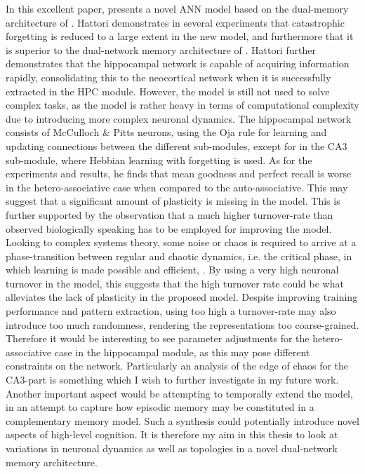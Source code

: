 In this excellent paper, \cite{Hattori2014} presents a novel ANN model based on the dual-memory architecture of \cite{McClelland1995}. Hattori demonstrates in several experiments that catastrophic forgetting is reduced to a large extent in the new model, and furthermore that it is superior to the dual-network memory architecture of \cite{Ans1997, French1997, Hattori2010}. Hattori further demonstrates that the hippocampal network is capable of acquiring information rapidly, consolidating this to the neocortical network when it is successfully extracted in the HPC module.
However, the model is still not used to solve complex tasks, as the model is rather heavy in terms of computational complexity due to introducing more complex neuronal dynamics. The hippocampal network consists of McCulloch \& Pitts neurons, using the Oja rule for learning and updating connections between the different sub-modules, except for in the CA3 sub-module, where Hebbian learning with forgetting is used.
As for the experiments and results, he finds that mean goodness and perfect recall is worse in the hetero-associative case when compared to the auto-associative. This may suggest that a significant amount of plasticity is missing in the model. This is further supported by the observation that a much higher turnover-rate than observed biologically speaking has to be employed for improving the model. Looking to complex systems theory, some noise or chaos is required to arrive at a phase-transition between regular and chaotic dynamics, i.e. the critical phase, in which learning is made possible and efficient, \cite{Langton1990, Newman2003}. By using a very high neuronal turnover in the model, this suggests that the high turnover rate could be what alleviates the lack of plasticity in the proposed model. Despite improving training performance and pattern extraction, using too high a turnover-rate may also introduce too much randomness, rendering the representations too coarse-grained. Therefore it would be interesting to see parameter adjustments for the hetero-associative case in the hippocampal module, as this may pose different constraints on the network. Particularly an analysis of the edge of chaos for the CA3-part is something which I wish to further investigate in my future work. Another important aspect would be attempting to temporally extend the model, in an attempt to capture how episodic memory may be constituted in a complementary memory model. Such a synthesis could potentially introduce novel aspects of high-level cognition. It is therefore my aim in this thesis to look at variations in neuronal dynamics as well as topologies in a novel dual-network memory architecture.

